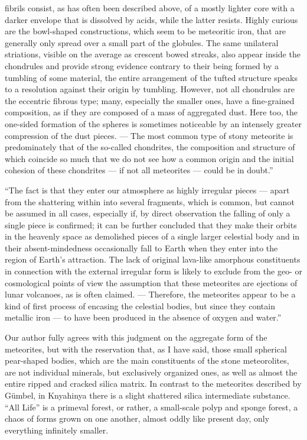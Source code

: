 \documentclass[a4paper, 12pt, oneside]{article}
\begin{document}
fibrils consist, as has often been described above, of a mostly lighter core with a darker envelope that is dissolved by acids, while the latter resists. Highly curious are the bowl-shaped constructions, which seem to be meteoritic iron, that are generally only spread over a small part of the globules. The same unilateral striations, visible on the average as crescent bowed streaks, also appear inside the chondrules and provide strong evidence contrary to their being formed by a tumbling of some material, the entire arrangement of the tufted structure speaks to a resolution against their origin by tumbling. However, not all chondrules are the eccentric fibrous type; many, especially the smaller ones, have a fine-grained composition, as if they are composed of a mass of aggregated dust. Here too, the one-sided formation of the spheres is sometimes noticeable by an intensely greater compression of the dust pieces. --- The most common type of stony meteorite is predominately that of the so-called chondrites, the composition and structure of which coincide so much that we do not see how a common origin and the initial cohesion of these chondrites --- if not all meteorites --- could be in doubt.''

``The fact is that they enter our atmosphere as highly irregular pieces --- apart from the shattering within into several fragments, which is common, but cannot be assumed in all cases, especially if, by direct observation the falling of only a single piece is confirmed; it can be further concluded that they make their orbits in the heavenly space as demolished pieces of a single larger celestial body and in their absent-mindedness occasionally fall to Earth when they enter into the region of Earth's attraction. The lack of original lava-like amorphous constituents in connection with the external irregular form is likely to exclude from the geo- or cosmological points of view the assumption that these meteorites are ejections of lunar volcanoes, as is often claimed. --- Therefore, the meteorites appear to be a kind of first process of encasing the celestial bodies, but since they contain metallic iron --- to have been produced in the absence of oxygen and water.''

Our author fully agrees with this judgment on the aggregate form of the meteorites, but with the reservation that, as I have said, those small spherical pear-shaped bodies, which are the main constituents of the stone meteorolites, are not individual minerals, but exclusively organized ones, as well as almost the entire ripped and cracked silica matrix. In contrast to the meteorites described by Gümbel, in Knyahinya there is a slight shattered silica intermediate substance. ``All Life'' is a primeval forest, or rather, a small-scale polyp and sponge forest, a chaos of forms grown on one another, almost oddly like present day, only everything infinitely smaller.
\end{document}
